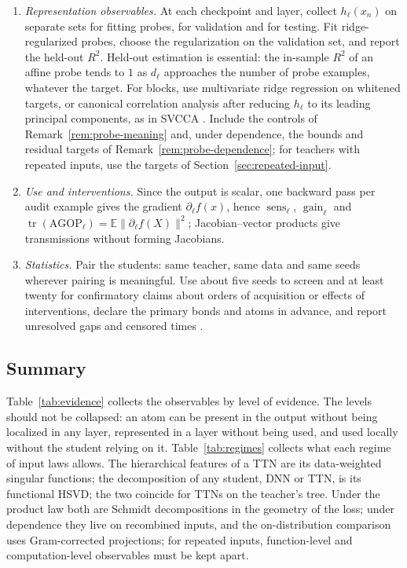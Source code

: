 \documentclass[11pt]{article}
\newcommand{\E}{\mathbb{E}}
\newcommand{\norm}[1]{\lVert #1\rVert}
\theoremstyle{definition}
\numberwithin{equation}{section}
\begin{document}
\begin{enumerate}[label=\arabic*.,nosep,leftmargin=*]
\item \emph{Representation observables.} At each checkpoint and layer, collect $h_\ell(x_n)$ on separate sets for fitting probes, for validation and for testing. Fit ridge-regularized probes, choose the regularization on the validation set, and report the held-out $R^2$. Held-out estimation is essential: the in-sample $R^2$ of an affine probe tends to $1$ as $d_\ell$ approaches the number of probe examples, whatever the target. For blocks, use multivariate ridge regression on whitened targets, or canonical correlation analysis after reducing $h_\ell$ to its leading principal components, as in SVCCA \citep{raghu2017svcca}. Include the controls of Remark~\ref{rem:probe-meaning} and, under dependence, the bounds and residual targets of Remark~\ref{rem:probe-dependence}; for teachers with repeated inputs, use the targets of Section~\ref{sec:repeated-input}.
\item \emph{Use and interventions.} Since the output is scalar, one backward pass per audit example gives the gradient $\partial_\ell f(x)$, hence $\operatorname{sens}_\ell$, $\operatorname{gain}_\ell$ and $\operatorname{tr}(\mathrm{AGOP}_\ell)=\E\norm{\partial_\ell f(X)}^2$; Jacobian--vector products give transmissions without forming Jacobians.
\item \emph{Statistics.} Pair the students: same teacher, same data and same seeds wherever pairing is meaningful. Use about five seeds to screen and at least twenty for confirmatory claims about orders of acquisition or effects of interventions, declare the primary bonds and atoms in advance, and report unresolved gaps and censored times \citep[Sections~9 and~10]{hfl_surrogate}.
\end{enumerate}

\subsection{Summary}\label{sec:compare-summary}

Table~\ref{tab:evidence} collects the observables by level of evidence. The levels should not be collapsed: an atom can be present in the output without being localized in any layer, represented in a layer without being used, and used locally without the student relying on it. Table~\ref{tab:regimes} collects what each regime of input laws allows. The hierarchical features of a TTN are its data-weighted singular functions; the decomposition of any student, DNN or TTN, is its functional HSVD; the two coincide for TTNs on the teacher's tree. Under the product law both are Schmidt decompositions in the geometry of the loss; under dependence they live on recombined inputs, and the on-distribution comparison uses Gram-corrected projections; for repeated inputs, function-level and computation-level observables must be kept apart.
\end{document}
